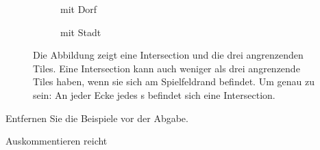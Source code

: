 \documentclass[
    inlineshortcut=java, %
    corporatedesign, %
    boxarc, %
    fop, %
]{algoexercise}
\begin{document}
\begin{figure}[h]
\begin{subfigure}[b]{\textwidth/3}
            \caption{mit Dorf}
            \label{fig:intersection:withVillage}
        \end{subfigure}%
        \begin{subfigure}[b]{\textwidth/3}
            \centering
            \caption{mit Stadt}
            \label{fig:intersection:withCity}
        \end{subfigure}%
        \caption[short]{Die Abbildung zeigt eine Intersection und die drei angrenzenden Tiles. Eine Intersection kann auch weniger als drei angrenzende Tiles haben, wenn sie sich am Spielfeldrand befindet. Um genau zu sein: An jeder Ecke jedes s befindet sich eine Intersection.}
        \label{fig:intersection}
    \end{figure}
    \FloatBarrier{}

    \begin{vanforderung}
        Entfernen Sie die Beispiele vor der Abgabe.
    \end{vanforderung}

    \begin{hinweis}
        Auskommentieren reicht
    \end{hinweis}

    \clearpage{}
\end{document}
